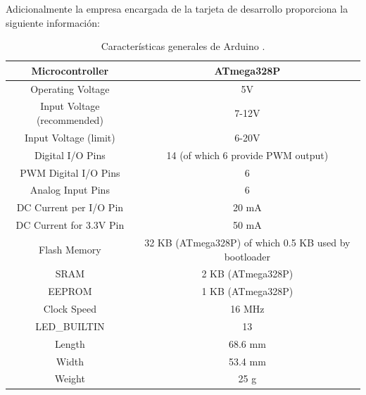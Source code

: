 Adicionalmente la empresa encargada de la tarjeta de desarrollo proporciona la siguiente información:
\begin{table}[H]
\centering
\begin{tabular}{|c|c|}
\hline
Microcontroller   & {ATmega328P}               \\ \hline
Operating Voltage           & 5V                                                    \\ \hline
Input Voltage (recommended) & 7-12V                                                 \\ \hline
Input Voltage (limit)       & 6-20V                                                 \\ \hline
Digital I/O Pins            & 14 (of which 6 provide PWM output)                    \\ \hline
PWM Digital I/O Pins        & 6                                                     \\ \hline
Analog Input Pins           & 6                                                     \\ \hline
DC Current per I/O Pin      & 20 mA                                                 \\ \hline
DC Current for 3.3V Pin     & 50 mA                                                 \\ \hline
Flash Memory                & 32 KB (ATmega328P) of which 0.5 KB used by bootloader \\ \hline
SRAM                        & 2 KB (ATmega328P)                                     \\ \hline
EEPROM                      & 1 KB (ATmega328P)                                     \\ \hline
Clock Speed                 & 16 MHz                                                \\ \hline
LED\_BUILTIN                & 13                                                    \\ \hline
Length                      & 68.6 mm                                               \\ \hline
Width                       & 53.4 mm                                               \\ \hline
Weight                      & 25 g                                                  \\ \hline
\end{tabular}
\caption{Características generales de Arduino \cite{arduino}.}
\label{t1}
\end{table}





